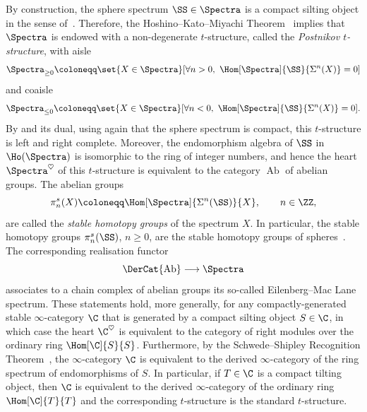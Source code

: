 \documentclass[a4paper]{amsart}
\begin{document}
\begin{example}
  \label{ex:spectra-silting}
  By construction, the sphere spectrum $\SS\in\Spectra$ is a compact silting
  object in the sense of~\cite[Definition~4.1]{AI12}. Therefore, the
  Hoshino--Kato--Miyachi Theorem~\cite[Theorem~1.3]{HKM02} implies that
  $\Spectra$ is endowed with a non-degenerate $t$-structure, called the
  \emph{Postnikov $t$-structure}, with aisle
  \[
    \Spectra_{\geq0}\coloneqq\set{X\in\Spectra}[\forall n>0,\
    \Hom[\Spectra]{\SS}{\Sigma^n(X)}=0]
  \]
  and coaisle
  \[
    \Spectra_{\leq0}\coloneqq\set{X\in\Spectra}[\forall n<0,\
    \Hom[\Spectra]{\SS}{\Sigma^n(X)}=0].
  \]
  By  and its dual, using again that the sphere
  spectrum is compact, this $t$-structure is left and right complete. Moreover,
  the endomorphism algebra of $\SS$ in $\Ho(\Spectra)$ is isomorphic to the ring
  of integer numbers, and hence the heart $\Spectra^\heartsuit$ of this
  $t$-structure is equivalent to the category $\operatorname{Ab}$ of abelian
  groups. The abelian groups
  \[
    \pi_n^s(X)\coloneqq\Hom[\Spectra]{\Sigma^n(\SS)}{X},\qquad n\in\ZZ,
  \]
  are called the \emph{stable homotopy groups} of the spectrum $X$. In
  particular, the stable homotopy groups $\pi_n^s(\SS)$, $n\geq0$, are the stable
  homotopy groups of spheres~\cite{IWX20}. The
  corresponding realisation functor
  \[
    \DerCat{\operatorname{Ab}}\longrightarrow\Spectra
  \]
  associates to a chain complex of abelian groups its so-called
  Eilenberg--Mac Lane spectrum. These statements hold, more generally, for any
  compactly-generated stable $\infty$-category $\C$ that is generated by a
  compact silting object $S\in\C$, in which case the heart $\C^{\heartsuit}$ is
  equivalent to the category of right modules over the ordinary ring
  $\Hom[\C]{S}{S}$. Furthermore, by the Schwede--Shipley Recognition
  Theorem~\cite[Theorem~7.1.2.1]{Lur17}, the $\infty$-category $\C$ is
  equivalent to the derived $\infty$-category of the ring spectrum of
  endomorphisms of $S$. In particular, if $T\in\C$ is a compact tilting object,
  then $\C$ is equivalent to the derived $\infty$-category of the ordinary ring
  $\Hom[\C]{T}{T}$ and the corresponding $t$-structure is the standard
  $t$-structure.
\end{example}
\end{document}
